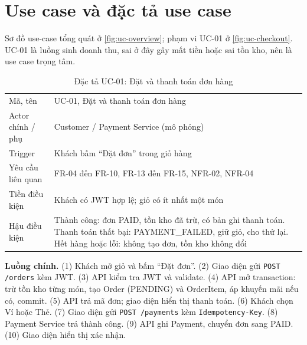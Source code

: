 \section{Use case và đặc tả use case}\label{sec:se-usecase}
Sơ đồ use-case tổng quát ở \cref{fig:uc-overview}; phạm vi UC-01 ở \cref{fig:uc-checkout}. UC-01 là luồng sinh doanh thu, sai ở đây gây mất tiền hoặc sai tồn kho, nên là use case trọng tâm.

\begin{table}[htbp]\centering
\caption{Đặc tả UC-01: Đặt và thanh toán đơn hàng}\label{tab:uc01}
\begin{tabular}{@{}p{3.1cm}p{10.2cm}@{}}\toprule
Mã, tên & UC-01, Đặt và thanh toán đơn hàng \\
Actor chính / phụ & Customer / Payment Service (mô phỏng) \\
Trigger & Khách bấm ``Đặt đơn'' trong giỏ hàng \\
Yêu cầu liên quan & FR-04 đến FR-10, FR-13 đến FR-15, NFR-02, NFR-04 \\
Tiền điều kiện & Khách có JWT hợp lệ; giỏ có ít nhất một món \\
Hậu điều kiện & Thành công: đơn PAID, tồn kho đã trừ, có bản ghi thanh toán. Thanh toán thất bại: PAYMENT\_FAILED, giữ giỏ, cho thử lại. Hết hàng hoặc lỗi: không tạo đơn, tồn kho không đổi \\ \bottomrule
\end{tabular}
\end{table}
\textbf{Luồng chính.} (1) Khách mở giỏ và bấm ``Đặt đơn''. (2) Giao diện gửi \texttt{POST /orders} kèm JWT. (3) API kiểm tra JWT và validate. (4) API mở transaction: trừ tồn kho từng món, tạo Order (PENDING) và OrderItem, áp khuyến mãi nếu có, commit. (5) API trả mã đơn; giao diện hiển thị thanh toán. (6) Khách chọn Ví hoặc Thẻ. (7) Giao diện gửi \texttt{POST /payments} kèm \texttt{Idempotency-Key}. (8) Payment Service trả thành công. (9) API ghi Payment, chuyển đơn sang PAID. (10) Giao diện hiển thị xác nhận.

